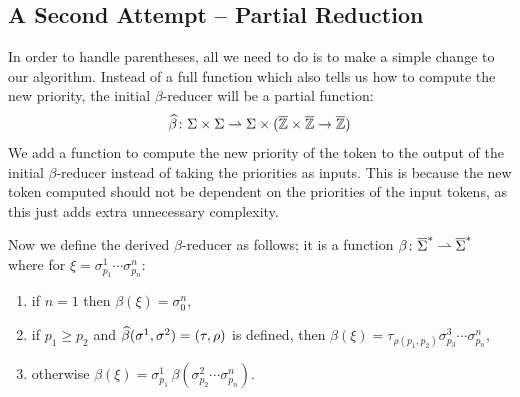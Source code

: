 \documentclass{llncs}
\newcounter{algo}
\begin{document}
\subsection{A Second Attempt -- Partial Reduction}

In order to handle parentheses, all we need to do is to make a simple change to our algorithm.
Instead of a full function which also tells us how to compute the new priority, the initial $\beta$-reducer will be a partial function:
\[ \widehat\beta\colon \Sigma\times\Sigma\rightharpoonup\Sigma\times(\overline{\mathbb Z}\times\overline{\mathbb Z}\to\overline{\mathbb Z}) \]
We add a function to compute the new priority of the token to the output of the initial $\beta$-reducer instead of taking the priorities as inputs.
This is because the new token computed should not be dependent on the priorities of the input tokens, as this just adds extra unnecessary
complexity.

Now we define the derived $\beta$-reducer as follows; it is a function $\beta\colon\overline\Sigma^*\rightharpoonup\overline\Sigma^*$ where for $\xi=\sigma^1_{p_1}\cdots\sigma^n_{p_n}$:
\begin{enumerate}
    \item if $n=1$ then $\beta(\xi)=\sigma^n_0$,
    \item if $p_1\geq p_2$ and $\widehat\beta(\sigma^1,\sigma^2)=(\tau,\rho)$ is defined, then $\beta(\xi)=\tau_{\rho(p_1,p_2)}\sigma^3_{p_3}\cdots\sigma^n_{p_n}$,
    \item otherwise $\beta(\xi)=\sigma^1_{p_1}\,\beta(\sigma^2_{p_2}\cdots\sigma^n_{p_n})$.
\end{enumerate}
\end{document}
